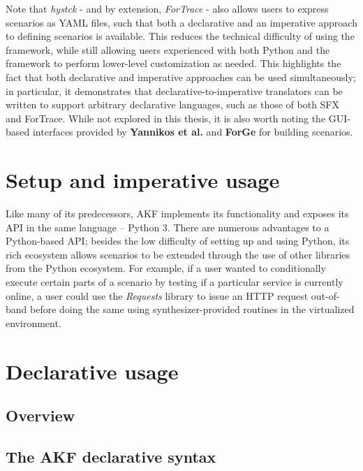 \documentclass[letterpaper,12pt]{report}
\begin{document}
Note that \emph{hystck} - and by extension, \emph{ForTrace} - also
allows users to express scenarios as YAML files, such that both a
declarative and an imperative approach to defining scenarios is
available. This reduces the technical difficulty of using the framework,
while still allowing users experienced with both Python and the
framework to perform lower-level customization as needed. This
highlights the fact that both declarative and imperative approaches can
be used simultaneously; in particular, it demonstrates that
declarative-to-imperative translators can be written to support
arbitrary declarative languages, such as those of both SFX and ForTrace.
While not explored in this thesis, it is also worth noting the GUI-based
interfaces provided by \textbf{Yannikos et al.} and \textbf{ForGe} for
building scenarios.

\section{Setup and imperative
usage}\label{setup-and-imperative-usage}

Like many of its predecessors, AKF implements its functionality and
exposes its API in the same language -- Python 3. There are numerous
advantages to a Python-based API; besides the low difficulty of setting
up and using Python, its rich ecosystem allows scenarios to be extended
through the use of other libraries from the Python ecosystem. For
example, if a user wanted to conditionally execute certain parts of a
scenario by testing if a particular service is currently online, a user
could use the \emph{Requests} library \cite{Requests31Documentation}
to issue an HTTP request out-of-band before doing the same using
synthesizer-provided routines in the virtualized environment.

\section{Declarative usage}\label{declarative-usage}

\subsection{Overview}\label{overview}

\subsection{The AKF declarative
syntax}\label{the-akf-declarative-syntax}
\end{document}
